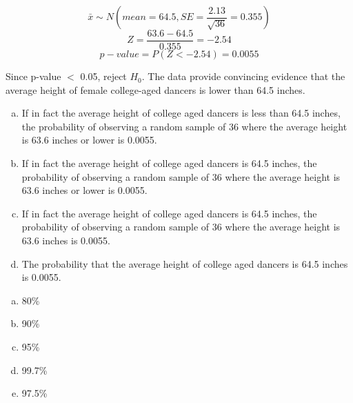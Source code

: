 \documentclass[11pt,containsverbatim,handout,xcolor=xelatex,dvipsnames,table]{beamer}
\newcommand{\solnMult}[1]{#1}
\begin{document}
\begin{frame}

\[ \bar{x} \sim N \left( mean = 64.5, SE = \frac{2.13}{\sqrt{36}} = 0.355 \right) \]
\pause
\[ Z = \frac{63.6 - 64.5}{0.355} = -2.54 \]
\pause
\[ p-value = P(Z < -2.54) = 0.0055 \]

\pause

Since p-value $<$ 0.05, reject $H_0$. The data provide convincing evidence that the average height of female college-aged dancers is lower than 64.5 inches.


\end{frame}


\begin{frame}


\begin{enumerate}[(a)]
\item If in fact the average height of college aged dancers is less than 64.5 inches, the probability of observing a random sample of 36 where the average height is 63.6 inches or lower is 0.0055.
\item \solnMult{If in fact the average height of college aged dancers is 64.5 inches, the probability of observing a random sample of 36 where the average height is 63.6 inches or lower is 0.0055.}
\item If in fact the average height of college aged dancers is 64.5 inches, the probability of observing a random sample of 36 where the average height is 63.6 inches is 0.0055.
\item The probability that the average height of college aged dancers is 64.5 inches is 0.0055.
\end{enumerate}

\end{frame}


\begin{frame}


\begin{enumerate}[(a)]
\item 80\%
\item \solnMult{90\%}
\item 95\%
\item 99.7\%
\item 97.5\%
\end{enumerate}

\end{frame}
\end{document}
